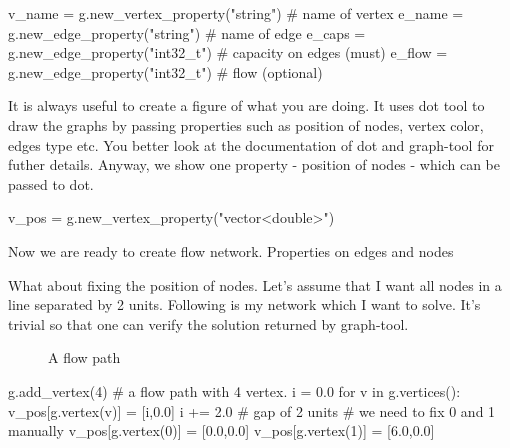 \documentclass[10pt,a4paper]{article}%
\begin{document}
\nwenddocs{}\endmoddef\nwstartdeflinemarkup\nwenddeflinemarkup
v_name = g.new_vertex_property("string") # name of vertex
e_name = g.new_edge_property("string") # name of edge 
e_caps = g.new_edge_property("int32_t") # capacity on edges (must)
e_flow = g.new_edge_property("int32_t") # flow (optional)


\nwendcode{}  It is always useful to create a figure of what you are doing. It uses
    {\Tt{}dot\nwendquote} tool to draw the graphs by passing properties such as position of
    nodes, vertex color, edges type etc. You better look at the documentation of
    dot and graph-tool for futher details. Anyway, we show one property -
    position of nodes
    - which can be passed to {\Tt{}dot\nwendquote}.

\nwenddocs{}\plusendmoddef\nwstartdeflinemarkup\nwenddeflinemarkup
v_pos = g.new_vertex_property("vector<double>")

\nwendcode{}Now we are ready to create flow network.
\nwenddocs{}\endmoddef\nwstartdeflinemarkup\nwenddeflinemarkup
\LA{}Properties on edges and nodes\RA{}

\nwendcode{}  What about fixing the position of nodes. Let's assume that I want all
    nodes in a line separated by 2 units. Following is my network which I want
    to solve. It's trivial so that one can verify the solution returned by
    {\Tt{}graph-tool\nwendquote}.

\begin{figure}[h]
\centering
{}
\caption{\small A flow path}
\label{fig:flow_path}
\end{figure}

\nwenddocs{}\plusendmoddef\nwstartdeflinemarkup\nwenddeflinemarkup
g.add_vertex(4) # a flow path with 4 vertex.
i = 0.0
for v in g.vertices():
    v_pos[g.vertex(v)] = [i,0.0]
    i += 2.0 # gap of 2 units
# we need to fix 0 and 1 manually
v_pos[g.vertex(0)] = [0.0,0.0]
v_pos[g.vertex(1)] = [6.0,0.0]
\end{document}
